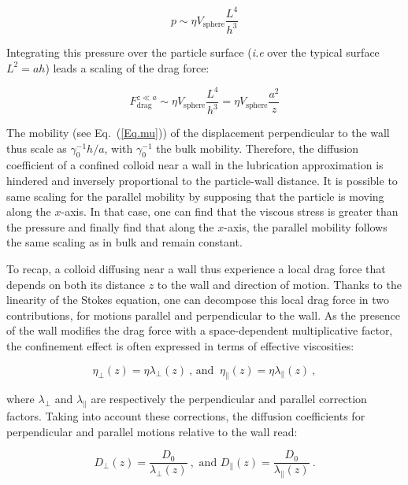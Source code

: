 \begin{equation}
	p \sim \eta V_\mathrm{sphere} \frac{L^4}{h^3}
\end{equation}

Integrating this pressure over the particle surface (\textit{i.e} over the typical surface $L^2 = ah$) leads a scaling of the drag force:

\begin{equation}
	F_\mathrm{drag} ^{z\ll a} \sim \eta V_\mathrm{sphere} \frac{L^4}{h^3} = \eta V_\mathrm{sphere} \frac{a^2}{z}
\end{equation}

The mobility (see Eq.~(\ref{Eq.mu})) of the displacement perpendicular to the wall  thus scale as $\gamma_0^{-1} h/a$, with $\gamma_0^{-1}$ the bulk mobility. Therefore, the diffusion coefficient of a confined colloid near a wall in the lubrication approximation is hindered and inversely proportional to the particle-wall distance. It is possible to same scaling for the parallel mobility by supposing that the particle is moving along the $x$-axis. In that case, one can find that the viscous stress is greater than the pressure and finally find that along the $x$-axis, the parallel mobility follows the same scaling as in bulk and remain constant.

To recap, a colloid diffusing near a wall thus experience a local drag force that depends on both its distance $z$ to the wall and direction of motion. Thanks to the linearity of the Stokes equation, one can decompose this local drag force in two contributions, for motions parallel and perpendicular to the wall. As the presence of the wall modifies the drag force with a space-dependent multiplicative factor, the confinement effect is often expressed in terms of effective viscosities:

\begin{equation}
	\eta _\bot (z) = {\eta}{\lambda _ \bot (z)}  ~ \text{, and } ~\eta _\parallel (z) =  {\eta}{\lambda _ \parallel (z)}~,
\end{equation}

where $\lambda _\bot$ and $\lambda _\parallel$ are respectively the perpendicular and parallel correction factors. Taking into account these corrections, the diffusion coefficients for perpendicular and parallel motions relative to the wall read:

\begin{equation}
	D_\bot (z) =  \frac{D_0}{\lambda _\bot (z)}  ~, \text{ and } D_\parallel (z) = \frac{D_0}{ \lambda_\parallel (z)} ~.
	\label{Eq.hindered}
\end{equation}

